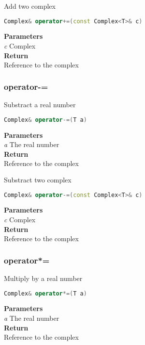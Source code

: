 \begin{mdframed}
Add two complex
\begin{lstlisting}[language=C++]
Complex& operator+=(const Complex<T>& c)
\end{lstlisting}
\textbf{Parameters} \\ 
\textit{c} Complex \\ 
\textbf{Return} \\ 
Reference to the complex\\ 
\end{mdframed}

\subsubsection{operator-=}
\begin{mdframed}
Substract a real number
\begin{lstlisting}[language=C++]
Complex& operator-=(T a)
\end{lstlisting}
\textbf{Parameters} \\ 
\textit{a} The real number  \\ 
\textbf{Return} \\ 
Reference to the complex\\ 
\end{mdframed}

\begin{mdframed}
Substract two complex
\begin{lstlisting}[language=C++]
Complex& operator-=(const Complex<T>& c)
\end{lstlisting}
\textbf{Parameters} \\ 
\textit{c} Complex \\ 
\textbf{Return} \\ 
Reference to the complex\\ 
\end{mdframed}

\subsubsection{operator*=}
\begin{mdframed}
Multiply by a real number
\begin{lstlisting}[language=C++]
Complex& operator*=(T a)
\end{lstlisting}
\textbf{Parameters} \\ 
\textit{a} The real number  \\ 
\textbf{Return} \\ 
Reference to the complex\\ 
\end{mdframed}

